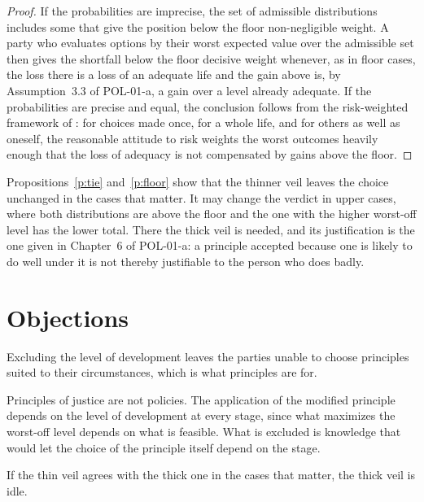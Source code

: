 \documentclass{situationist-preprint}
\begin{document}
\begin{proof}
If the probabilities are imprecise, the set of admissible distributions includes some that give the position below the floor non-negligible weight. A party who evaluates options by their worst expected value over the admissible set \citep{Gilboa1989} then gives the shortfall below the floor decisive weight whenever, as in floor cases, the loss there is a loss of an adequate life and the gain above is, by Assumption~3.3 of POL-01-a, a gain over a level already adequate. If the probabilities are precise and equal, the conclusion follows from the risk-weighted framework of \citet{Buchak2017}: for choices made once, for a whole life, and for others as well as oneself, the reasonable attitude to risk weights the worst outcomes heavily enough that the loss of adequacy is not compensated by gains above the floor.
\end{proof}

Propositions~\ref{p:tie} and~\ref{p:floor} show that the thinner veil leaves the choice unchanged in the cases that matter. It may change the verdict in upper cases, where both distributions are above the floor and the one with the higher worst-off level has the lower total. There the thick veil is needed, and its justification is the one given in Chapter~6 of POL-01-a: a principle accepted because one is likely to do well under it is not thereby justifiable to the person who does badly.

\section{Objections}

\begin{objection}
Excluding the level of development leaves the parties unable to choose principles suited to their circumstances, which is what principles are for.
\end{objection}

\begin{reply}
Principles of justice are not policies. The application of the modified principle depends on the level of development at every stage, since what maximizes the worst-off level depends on what is feasible. What is excluded is knowledge that would let the choice of the principle itself depend on the stage.
\end{reply}

\begin{objection}
If the thin veil agrees with the thick one in the cases that matter, the thick veil is idle.
\end{objection}
\end{document}
